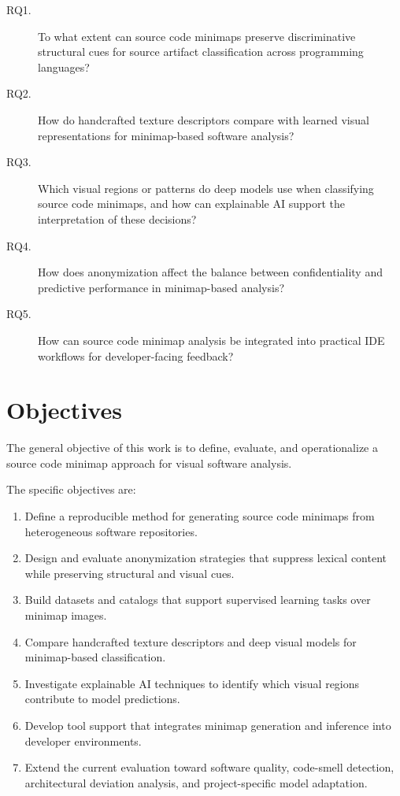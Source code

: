 \begin{description}
    \item[RQ1.] To what extent can source code minimaps preserve discriminative
    structural cues for source artifact classification across programming
    languages?

    \item[RQ2.] How do handcrafted texture descriptors compare with learned
    visual representations for minimap-based software analysis?

    \item[RQ3.] Which visual regions or patterns do deep models use when
    classifying source code minimaps, and how can explainable AI support the
    interpretation of these decisions?

    \item[RQ4.] How does anonymization affect the balance between
    confidentiality and predictive performance in minimap-based analysis?

    \item[RQ5.] How can source code minimap analysis be integrated into practical
    IDE workflows for developer-facing feedback?
\end{description}

\section{Objectives}

The general objective of this work is to define, evaluate, and
operationalize a source code minimap approach for visual software analysis.

The specific objectives are:

\begin{enumerate}
    \item Define a reproducible method for generating source code minimaps from
    heterogeneous software repositories.

    \item Design and evaluate anonymization strategies that suppress lexical
    content while preserving structural and visual cues.

    \item Build datasets and catalogs that support supervised learning tasks
    over minimap images.

    \item Compare handcrafted texture descriptors and deep visual models for
    minimap-based classification.

    \item Investigate explainable AI techniques to identify which visual regions
    contribute to model predictions.

    \item Develop tool support that integrates minimap generation and inference
    into developer environments.

    \item Extend the current evaluation toward software quality, code-smell
    detection, architectural deviation analysis, and project-specific model
    adaptation.
\end{enumerate}

